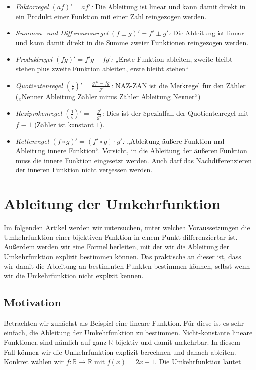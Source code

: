 \documentclass[fontsize=9pt,
               parskip=half-,
               DIV=14,
               listof=chapterentry,
               tocflat]{scrbook}
\begin{document}
\begin{itemize}
\item \emph{Faktorregel $(af)'=af'$:} Die Ableitung ist linear und kann damit direkt in ein Produkt einer Funktion mit einer Zahl reingezogen werden.
\item \emph{Summen- und Differenzenregel $(f\pm g)'=f'\pm g'$:} Die Ableitung ist linear und kann damit direkt in die Summe zweier Funktionen reingezogen werden.
\item \emph{Produktregel $(fg)'=f'g+fg'$:} „Erste Funktion ableiten, zweite bleibt stehen plus zweite Funktion ableiten, erste bleibt stehen“
\item \emph{Quotientenregel $\left({\tfrac {f}{g}}\right)'={\tfrac {gf'-fg'}{g^{2}}}$:} NAZ-ZAN ist die Merkregel für den Zähler („Nenner Ableitung Zähler minus Zähler Ableitung Nenner“)
\item \emph{Reziprokenregel $\left({\frac {1}{g}}\right)'=-{\frac {g'}{g^{2}}}$:} Dies ist der Spezialfall der Quotientenregel mit $f\equiv 1$ (Zähler ist konstant $1$).
\item \emph{Kettenregel $(f\circ g)'=(f'\circ g)\cdot g'$:} „Ableitung äußere Funktion mal Ableitung innere Funktion“. Vorsicht, in die Ableitung der äußeren Funktion muss die innere Funktion eingesetzt werden. Auch darf das Nachdifferenzieren der inneren Funktion nicht vergessen werden.
\end{itemize}

\chapter{Ableitung der Umkehrfunktion}

Im folgenden Artikel werden wir untersuchen, unter welchen Voraussetzungen die Umkehrfunktion einer bijektiven Funktion in einem Punkt differenzierbar ist. Außerdem werden wir eine Formel herleiten, mit der wir die Ableitung der Umkehrfunktion explizit bestimmen können. Das praktische an dieser ist, dass wir damit die Ableitung an bestimmten Punkten bestimmen können, selbst wenn wir die Umkehrfunktion nicht explizit kennen.

\section{Motivation}

Betrachten wir zunächst als Beispiel eine lineare Funktion. Für diese ist es sehr einfach, die Ableitung der Umkehrfunktion zu bestimmen. Nicht-konstante lineare Funktionen sind nämlich auf ganz $\mathbb {R} $ bijektiv und damit umkehrbar. In diesem Fall können wir die Umkehrfunktion explizit berechnen und danach ableiten. Konkret wählen wir $f:\mathbb {R} \to \mathbb {R} $ mit $f(x)=2x-1$. Die Umkehrfunktion lautet
\end{document}
